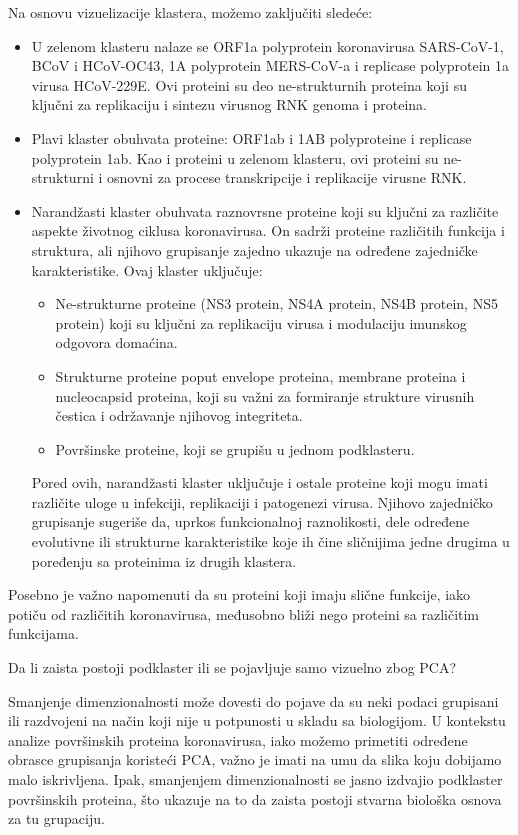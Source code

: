 \documentclass[a4paper,12pt]{article}
\begin{document}
\bigskip
Na osnovu vizuelizacije klastera, možemo zaključiti sledeće:
\begin{itemize}
    \item U zelenom klasteru nalaze se ORF1a polyprotein koronavirusa SARS-CoV-1, BCoV i HCoV-OC43, 1A polyprotein MERS-CoV-a i replicase polyprotein 1a virusa HCoV-229E. Ovi proteini su deo ne-strukturnih proteina koji su ključni za replikaciju i sintezu virusnog RNK genoma i proteina.
    \item Plavi klaster obuhvata proteine: ORF1ab i 1AB polyproteine i replicase polyprotein 1ab. Kao i proteini u zelenom klasteru, ovi proteini su ne-strukturni i osnovni za procese transkripcije i replikacije virusne RNK.
    \item Narandžasti klaster obuhvata raznovrsne proteine koji su ključni za različite aspekte životnog ciklusa koronavirusa. On sadrži proteine različitih funkcija i struktura, ali njihovo grupisanje zajedno ukazuje na određene zajedničke karakteristike. 
    \newpage
    Ovaj klaster uključuje: 
    \begin{itemize}
        \item Ne-strukturne proteine (NS3 protein, NS4A protein, NS4B protein, NS5 protein) koji su ključni za replikaciju virusa i modulaciju imunskog odgovora domaćina. 
        \item Strukturne proteine poput envelope proteina, membrane proteina i nucleocapsid proteina, koji su važni za formiranje strukture virusnih čestica i održavanje njihovog integriteta.
        \item Površinske proteine, koji se grupišu u jednom podklasteru.
    \end{itemize}

    Pored ovih, narandžasti klaster uključuje i ostale proteine koji mogu imati različite uloge u infekciji, replikaciji i patogenezi virusa. Njihovo zajedničko grupisanje sugeriše da, uprkos funkcionalnoj raznolikosti, dele određene evolutivne ili strukturne karakteristike koje ih čine sličnijima jedne drugima u poređenju sa proteinima iz drugih klastera.
\end{itemize}

\bigskip
Posebno je važno napomenuti da su proteini koji imaju slične funkcije, iako potiču od različitih koronavirusa, međusobno bliži nego proteini sa različitim funkcijama.

\bigskip
Da li zaista postoji podklaster ili se pojavljuje samo vizuelno zbog PCA?

\smallskip
Smanjenje dimenzionalnosti može dovesti do pojave da su neki podaci grupisani ili razdvojeni na način koji nije u potpunosti u skladu sa biologijom. 
U kontekstu analize površinskih proteina koronavirusa, iako možemo primetiti određene obrasce grupisanja koristeći PCA, važno je imati na umu da slika koju dobijamo malo iskrivljena. Ipak, smanjenjem dimenzionalnosti se jasno izdvajio podklaster površinskih proteina, što ukazuje na to da zaista postoji stvarna biološka osnova za tu grupaciju.
\end{document}
